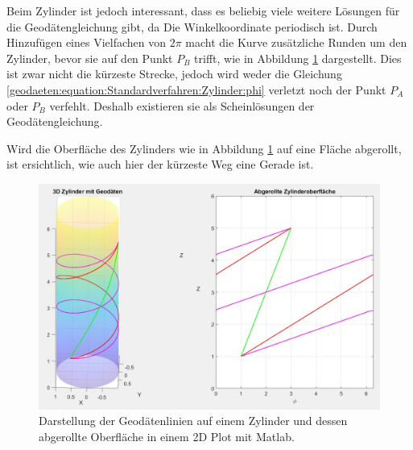 Beim Zylinder ist jedoch interessant, dass es beliebig viele weitere Lösungen für die Geodätengleichung gibt, da Die Winkelkoordinate periodisch ist.
Durch Hinzufügen eines Vielfachen von $2\pi$ macht die Kurve zusätzliche Runden um den Zylinder, bevor sie auf den Punkt $P_B$ trifft, wie in Abbildung \ref{geodaeten:figure:Standardverfahren:Zylinder:figure1} dargestellt.
Dies ist zwar nicht die kürzeste Strecke, jedoch wird weder die Gleichung \eqref{geodaeten:equation:Standardverfahren:Zylinder:phi} verletzt noch der Punkt $P_A$ oder $P_B$ verfehlt.
Deshalb existieren sie als Scheinlösungen der Geodätengleichung.

Wird die Oberfläche des Zylinders wie in Abbildung \ref{geodaeten:figure:Standardverfahren:Zylinder:figure1} auf eine Fläche abgerollt, ist ersichtlich, wie auch hier der kürzeste Weg eine Gerade ist.  

\begin{figure}
	\centering
	\includegraphics[width=\textwidth]{papers/geodaeten/Abbildungen/Standardverfahren/Zylinder}
	\caption{Darstellung der Geodätenlinien auf einem Zylinder und dessen abgerollte Oberfläche in einem 2D Plot mit Matlab.}
	\label{geodaeten:figure:Standardverfahren:Zylinder:figure1}
\end{figure}

